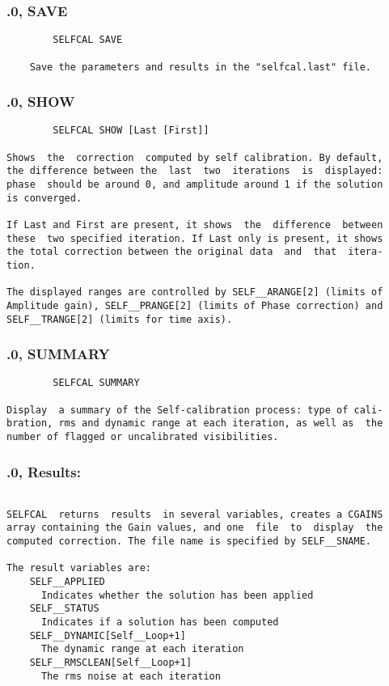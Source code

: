 \subsubsection{.0, SAVE}
\begin{verbatim}
        SELFCAL SAVE

    Save the parameters and results in the "selfcal.last" file.

\end{verbatim}
\subsubsection{.0, SHOW}
\begin{verbatim}
        SELFCAL SHOW [Last [First]]

Shows  the  correction  computed by self calibration. By default,
the difference between the  last  two  iterations  is  displayed:
phase  should be around 0, and amplitude around 1 if the solution
is converged.

If Last and First are present, it shows  the  difference  between
these  two specified iteration. If Last only is present, it shows
the total correction between the original data  and  that  itera-
tion.

The displayed ranges are controlled by SELF__ARANGE[2] (limits of
Amplitude gain), SELF__PRANGE[2] (limits of Phase correction) and
SELF__TRANGE[2] (limits for time axis).

\end{verbatim}
\subsubsection{.0, SUMMARY}
\begin{verbatim}
        SELFCAL SUMMARY

Display  a summary of the Self-calibration process: type of cali-
bration, rms and dynamic range at each iteration, as well as  the
number of flagged or uncalibrated visibilities.

\end{verbatim}
\subsubsection{.0, Results:}
\begin{verbatim}

SELFCAL  returns  results  in several variables, creates a CGAINS
array containing the Gain values, and one  file  to  display  the
computed correction. The file name is specified by SELF__SNAME.

The result variables are:
    SELF__APPLIED
      Indicates whether the solution has been applied
    SELF__STATUS
      Indicates if a solution has been computed
    SELF__DYNAMIC[Self__Loop+1]
      The dynamic range at each iteration
    SELF__RMSCLEAN[Self__Loop+1]
      The rms noise at each iteration
\end{verbatim}
